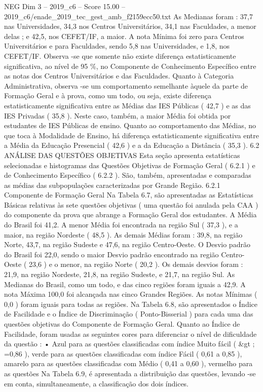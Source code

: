\begin{textsample}{NEG Dim 3 – 2019\_c6 – Score 15.00 – 2019\_c6/enade\_2019\_tec\_gest\_amb\_f2159ecc50.txt}
As Medianas foram : 37,7 nas Universidades, 34,3 nos Centros Universitários, 34,1 nas Faculdades, a menor delas ; e 42,5, nos CEFET/IF, a maior.
A nota Mínima foi zero para Centros Universitários e para Faculdades, sendo 5,8 nas Universidades, e 1,8, nos CEFET/IF.
Observa -se que somente não existe diferença estatisticamente significativa, ao nível de 95 \%, no Componente de Conhecimento Específico entre as notas dos Centros Universitários e das Faculdades.
Quanto à Categoria Administrativa, observa -se um comportamento semelhante àquele da parte de Formação Geral e à prova, como um todo, ou seja, existe diferença estatisticamente significativa entre as Médias das IES Públicas ( 42,7 ) e as das IES Privadas ( 35,8 ).
Neste caso, também, a maior Média foi obtida por estudantes de IES Públicas de ensino.
Quanto ao comportamento das Médias, no que toca à Modalidade de Ensino, há diferença estatisticamente significativa entre a Média da Educação Presencial ( 42,6 ) e a da Educação a Distância ( 35,3 ). 6.2 ANÁLISE DAS QUESTÕES OBJETIVAS Esta seção apresenta estatísticas selecionadas e histogramas das Questões Objetivas de Formação Geral ( 6.2.1 ) e de Conhecimento Específico ( 6.2.2 ).
São, também, apresentadas e comparadas as médias das subpopulações caracterizadas por Grande Região. 6.2.1 Componente de Formação Geral Na Tabela 6.7, são apresentadas as Estatísticas Básicas relativas às sete questões objetivas ( uma questão foi anulada pela CAA ) do componente da prova que abrange a Formação Geral dos estudantes.
A Média do Brasil foi 41,2.
A menor Média foi encontrada na região Sul ( 37,3 ), e a maior, na região Nordeste ( 48,5 ).
As demais Médias foram : 39,8, na região Norte, 43,7, na região Sudeste e 47,6, na região Centro-Oeste.
O Desvio padrão do Brasil foi 22,0, sendo o maior Desvio padrão encontrado na região Centro-Oeste ( 23,6 ) e o menor, na região Norte ( 20,2 ).
Os demais desvios foram : 21,9, na região Nordeste, 21,8, na região Sudeste, e 21,7, na região Sul.
As Medianas do Brasil, como um todo, e das cinco regiões foram iguais a 42,9.
A nota Máxima 100,0 foi alcançada nas cinco Grandes Regiões.
As notas Mínimas ( 0,0 ) foram iguais para todas as regiões.
Na Tabela 6.8, são apresentados o Índice de Facilidade e o Índice de Discriminação ( Ponto-Bisserial ) para cada uma das questões objetivas do Componente de Formação Geral.
Quanto ao Índice de Facilidade, foram usadas as seguintes cores para diferenciar o nível de dificuldade da questão : • Azul para as questões classificadas com índice Muito fácil ( \&gt ; =0,86 ), verde para as questões classificadas com índice Fácil ( 0,61 a 0,85 ), amarelo para as questões classificadas com Médio ( 0,41 a 0,60 ), vermelho para as questões Na Tabela 6.9, é apresentada a distribuição das questões, levando -se em conta, simultaneamente, a classificação dos dois índices.

\end{textsample}
